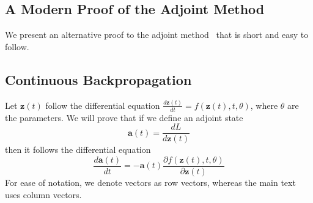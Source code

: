 \documentclass{article}
\newcommand{\va}{\mathbf{a}}
\newcommand{\vz}{\mathbf{z}}
\newcommand{\sol}{\vz}  %
\newcommand{\adj}{\va}
\begin{document}
\begin{appendices}
\section{A Modern Proof of the Adjoint Method}
\label{sec:modern_adj_proof}

We present an alternative proof to the adjoint method~\citep{pontryagin1962mathematical} that is short and easy to follow.

\subsection{Continuous Backpropagation}
Let $\sol(t)$ follow the differential equation $\frac{d\sol(t)}{dt} = f(\sol(t), t, \theta)$, where $\theta$ are the parameters. We will prove that if we define an adjoint state 
\begin{equation}
\adj(t) = \frac{dL}{d\sol(t)}
\end{equation} 
then it follows the differential equation
\begin{equation}\label{eq:adj_method}
\frac{d\adj(t)}{dt} = - \adj(t)\frac{\partial f(\sol(t), t, \theta)}{\partial \sol(t)} 
\end{equation}
For ease of notation, we denote vectors as row vectors, whereas the main text uses column vectors.


\end{appendices}
\end{document}
